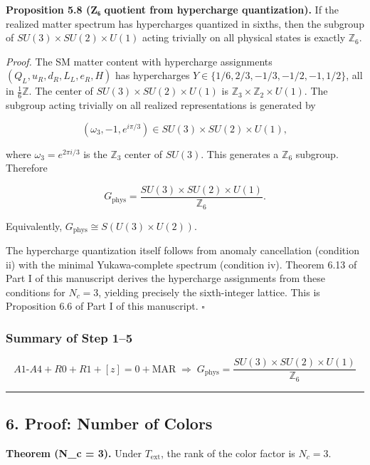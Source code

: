 \textbf{Proposition 5.8 (Z₆ quotient from hypercharge quantization).} If the realized matter spectrum has hypercharges quantized in sixths, then the subgroup of \(SU(3) \times SU(2) \times U(1)\) acting trivially on all physical states is exactly \(\mathbb{Z}_6\).

\emph{Proof.} The SM matter content with hypercharge assignments \((Q_L, u_R, d_R, L_L, e_R, H)\) has hypercharges \(Y \in \{1/6, 2/3, -1/3, -1/2, -1, 1/2\}\), all in \(\frac{1}{6}\mathbb{Z}\). The center of \(SU(3) \times SU(2) \times U(1)\) is \(\mathbb{Z}_3 \times \mathbb{Z}_2 \times U(1)\). The subgroup acting trivially on all realized representations is generated by

\[(\omega_3, -1, e^{i\pi/3}) \in SU(3) \times SU(2) \times U(1),\]

where \(\omega_3 = e^{2\pi i/3}\) is the \(\mathbb{Z}_3\) center of \(SU(3)\). This generates a \(\mathbb{Z}_6\) subgroup. Therefore

\[G_{\mathrm{phys}} = \frac{SU(3) \times SU(2) \times U(1)}{\mathbb{Z}_6}.\]

Equivalently, \(G_{\mathrm{phys}} \cong S(U(3) \times U(2))\).

The hypercharge quantization itself follows from anomaly cancellation (condition ii) with the minimal Yukawa-complete spectrum (condition iv). Theorem 6.13 of Part I of this manuscript derives the hypercharge assignments from these conditions for \(N_c = 3\), yielding precisely the sixth-integer lattice. This is Proposition 6.6 of Part I of this manuscript. \(\square\)

\subsubsection{Summary of Step 1--5}\label{summary-of-step-15}

\[\boxed{A1\text{-}A4 + R0 + R1 + [z]=0 + \mathrm{MAR} \;\Longrightarrow\; G_{\mathrm{phys}} = \frac{SU(3) \times SU(2) \times U(1)}{\mathbb{Z}_6}}\]

\begin{center}\rule{0.5\linewidth}{0.5pt}\end{center}

\subsection{6. Proof: Number of Colors}\label{6-proof-number-of-colors}

\textbf{Theorem (N\_c = 3).} Under \(T_{\mathrm{ext}}\), the rank of the color factor is \(N_c = 3\).

